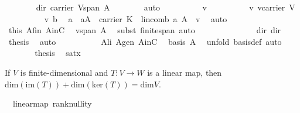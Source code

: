 \begin{isabellebody}
\ \ \ \ \ \ \isamarkupfalse%
\ dir{}{\isacharcolon}\ {\isachardoublequoteopen}carrier\ V{\isasymsubseteq}span\ A{\isachardoublequoteclose}\isanewline
\ \ \ \ \ \ \isamarkupfalse%
\ {\isacharparenleft}auto{\isacharparenright}\isanewline
\ \ \ \ \ \ \ \ \isamarkupfalse%
\ v\isanewline
\ \ \ \ \ \ \ \ \isamarkupfalse%
\ v{\isacharcolon}\ {\isachardoublequoteopen}v{\isasymin}carrier\ V{\isachardoublequoteclose}\isanewline
\ \ \ \ \ \ \ \ \isamarkupfalse%
\ v\ b{}\ \isamarkupfalse%
\ a\ \ {\isachardoublequoteopen}a{\isasymin}A\ {\isasymrightarrow}\ carrier\ K\ {\isasymand}\ lincomb\ a\ A\ {\isacharequal}\ v{\isachardoublequoteclose}\ \isamarkupfalse%
\ auto\isanewline
\ \ \ \ \ \ \ \ \isamarkupfalse%
\ this\ A{\isacharunderscore}fin\ AinC\ \isamarkupfalse%
\ {\isachardoublequoteopen}v{\isasymin}span\ A{\isachardoublequoteclose}\ \isamarkupfalse%
\ {\isacharparenleft}subst\ finite{\isacharunderscore}span{\isacharcomma}\ auto{\isacharparenright}\isanewline
\ \ \ \ \ \ \isamarkupfalse%
\isanewline
\ \ \ \ \ \ \isamarkupfalse%
\ dir{}\ dir{}\ \isamarkupfalse%
\ {\isacharquery}thesis\ \isamarkupfalse%
\ auto\isanewline
\ \ \ \ \isamarkupfalse%
\isanewline
\ \ \ \ \isamarkupfalse%
\ A{\isacharunderscore}li\ A{\isacharunderscore}gen\ AinC\ \isamarkupfalse%
\ {\isachardoublequoteopen}basis\ A{\isachardoublequoteclose}\ \isamarkupfalse%
\ {\isacharparenleft}unfold\ basis{\isacharunderscore}def{\isacharcomma}\ auto{\isacharparenright}\isanewline
\ \ \isamarkupfalse%
\isanewline
\ \ \isamarkupfalse%
\ {}\ {}\ \isamarkupfalse%
\ {\isacharquery}thesis\ \isamarkupfalse%
\ satx\isanewline
{}\isamarkupfalse%
%
\endisatagproof
{\isafoldproof}%
%
\isadelimproof
%
\endisadelimproof
%
\isamarkuptrue%
%
\begin{isamarkuptext}%
If $V$ is finite-dimensional and $T:V\to W$ is a linear map, then $\text{dim}(\text{im}(T))+
\text{dim}(\text{ker}(T)) = \text{dim} V$.%
\end{isamarkuptext}%
\isamarkuptrue%
\isamarkupfalse%
\ {\isacharparenleft}\ linear{\isacharunderscore}map{\isacharparenright}\ rank{\isacharunderscore}nullity{\isacharcolon}\ \isanewline

\end{isabellebody}
